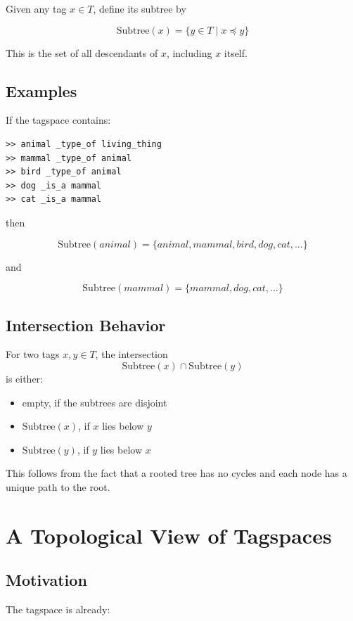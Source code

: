 \documentclass{article}
\begin{document}
Given any tag $x \in T$, define its subtree by

\[
\mathrm{Subtree}(x) = \{ y \in T \mid x \preceq y \}
\]

This is the set of all descendants of $x$, including $x$ itself.

\subsection{Examples}

If the tagspace contains:

\begin{verbatim}
>> animal _type_of living_thing
>> mammal _type_of animal
>> bird _type_of animal
>> dog _is_a mammal
>> cat _is_a mammal
\end{verbatim}

then

\[
\mathrm{Subtree}(animal)
=
\{animal, mammal, bird, dog, cat, \dots \}
\]

and

\[
\mathrm{Subtree}(mammal)
=
\{mammal, dog, cat, \dots \}
\]

\subsection{Intersection Behavior}

For two tags $x,y \in T$, the intersection
\[
\mathrm{Subtree}(x) \cap \mathrm{Subtree}(y)
\]
is either:

\begin{itemize}
    \item empty, if the subtrees are disjoint
    \item $\mathrm{Subtree}(x)$, if $x$ lies below $y$
    \item $\mathrm{Subtree}(y)$, if $y$ lies below $x$
\end{itemize}

This follows from the fact that a rooted tree has no cycles and each node
has a unique path to the root.

\section{A Topological View of Tagspaces}

\subsection{Motivation}

The tagspace is already:
\end{document}
